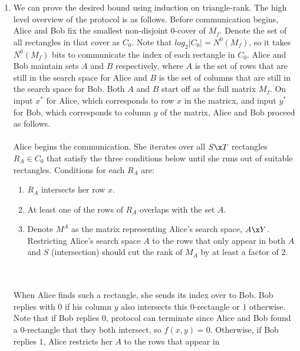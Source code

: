 \documentclass{article}
\begin{document}
\begin{enumerate}
\begin{enumerate}
        \item We can prove the desired bound using induction on triangle-rank.
            The high level overview of the protocol is as follows. Before
            communication begins, Alice and Bob fix the smallest non-disjoint
            0-cover of $M_f$. Denote the set of all rectangles in that cover as
            $C_0$. Note that $log_2 |C_0| = N^0(M_f)$, so it takes $N^0(M_f)$
            bits to communicate the index of each rectangle in $C_0$. Alice and
            Bob maintain sets $A$ and $B$ respectively, where $A$ is the set of
            rows that are still in the search space for Alice and $B$ is the
            set of columns that are still in the search space for Bob. Both $A$
            and $B$ start off as the full matrix $M_f$. On input $x^*$ for
            Alice, which corresponds to row $x$ in the matricx, and input $y^*$
            for Bob, which corresponds to column $y$ of the matrix, Alice and
            Bob proceed as follows.
            \\\\
            Alice begins the communication. She iterates over all $S \x T$
            rectangles $R_A \in C_0$ that satisfy the three conditions below
            until she runs out of suitable rectangles. Conditions for each
            $R_A$ are:
            \begin{enumerate}
                \item $R_A$ intersects her row $x$.
                \item At least one of the rows of $R_A$ overlaps with the set
                    $A$.
                \item Denote $M^A$ as the matrix representing Alice's search
                    space, $A \x Y$. Restricting Alice's search space $A$ to
                    the rows that only appear in both $A$ and $S$
                    (intersection) should cut the rank of $M_A$ by at least a
                    factor of 2.
            \end{enumerate}
            \\\\
            When Alice finds such a rectangle, she sends its index over to Bob.
            Bob replies with $0$ if his column $y$ also intersects this
            0-rectangle or $1$ otherwise. Note that if Bob replies $0$,
            protocol can terminate since Alice and Bob found a 0-rectangle that
            they both intersect, so $f(x,y) = 0$. Otherwise, if Bob replies
            $1$, Alice restricts her $A$ to the rows that appear in

\end{enumerate}
\end{enumerate}
\end{document}
